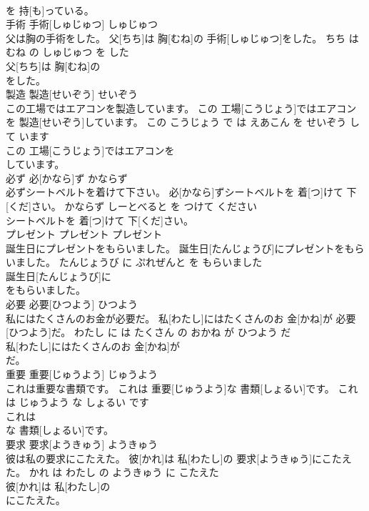 \documentclass[8pt]{extreport}
\begin{document}
\begin{CJK}{UTF8}{min}
\\	を 持[も]っている。			
\\	手術	手術[しゅじゅつ]	しゅじゅつ	
\\	父は胸の手術をした。	父[ちち]は 胸[むね]の 手術[しゅじゅつ]をした。	ちち は むね の しゅじゅつ を した	
\\	父[ちち]は 胸[むね]の
\\	をした。			
\\	製造	製造[せいぞう]	せいぞう	
\\	この工場ではエアコンを製造しています。	この 工場[こうじょう]ではエアコンを 製造[せいぞう]しています。	この こうじょう で は えあこん を せいぞう して います	
\\	この 工場[こうじょう]ではエアコンを
\\	しています。			
\\	必ず	必[かなら]ず	かならず	
\\	必ずシートベルトを着けて下さい。	必[かなら]ずシートベルトを 着[つ]けて 下[くだ]さい。	かならず しーとべると を つけて ください	
\\	シートベルトを 着[つ]けて 下[くだ]さい。			
\\	プレゼント	プレゼント	プレゼント	
\\	誕生日にプレゼントをもらいました。	誕生日[たんじょうび]にプレゼントをもらいました。	たんじょうび に ぷれぜんと を もらいました	
\\	誕生日[たんじょうび]に
\\	をもらいました。			
\\	必要	必要[ひつよう]	ひつよう	
\\	私にはたくさんのお金が必要だ。	私[わたし]にはたくさんのお 金[かね]が 必要[ひつよう]だ。	わたし に は たくさん の おかね が ひつよう だ	
\\	私[わたし]にはたくさんのお 金[かね]が
\\	だ。			
\\	重要	重要[じゅうよう]	じゅうよう	
\\	これは重要な書類です。	これは 重要[じゅうよう]な 書類[しょるい]です。	これ は じゅうよう な しょるい です	
\\	これは
\\	な 書類[しょるい]です。			
\\	要求	要求[ようきゅう]	ようきゅう	
\\	彼は私の要求にこたえた。	彼[かれ]は 私[わたし]の 要求[ようきゅう]にこたえた。	かれ は わたし の ようきゅう に こたえた	
\\	彼[かれ]は 私[わたし]の
\\	にこたえた。			

\end{CJK}
\end{document}
